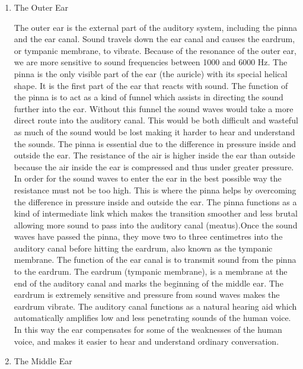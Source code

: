 \vfill
\begin{enumerate}
	\item The Outer Ear
	
	The outer ear is the external part of the auditory system, including the pinna 
	and the ear canal. Sound travels down the ear canal and causes the eardrum, 
	or tympanic membrane, to vibrate. Because of the resonance of the outer ear, 
	we are more sensitive to sound frequencies between 1000 and 6000 Hz.
	The pinna is the only visible part of the ear (the auricle) with its special helical shape. It is the first part of the ear that reacts with sound. The function of the pinna is to act as a kind of funnel which assists in directing the sound further into the ear. Without this funnel the sound waves would take a more direct route into the auditory canal. This would be both difficult and wasteful as much of the sound would be lost making it harder to hear and understand the sounds. The pinna is essential due to the difference in pressure inside and outside the ear. The resistance of the air is higher inside the ear than outside because the air inside the ear is compressed and thus under greater pressure.
	In order for the sound waves to enter the ear in the best possible way the resistance must not be too high. This is where the pinna helps by overcoming the difference in pressure inside and outside the ear. The pinna functions as a kind of intermediate link which makes the transition smoother and less brutal allowing more sound to pass into the auditory canal (meatus).Once the sound waves have passed the pinna, they move two to three centimetres into the auditory canal before hitting the eardrum, also known as the tympanic membrane. The function of the ear canal is to transmit sound from the pinna to the eardrum. The eardrum (tympanic membrane), is a membrane at the end of the auditory canal and marks the beginning of the middle ear. The eardrum is extremely sensitive and pressure from sound waves makes the eardrum vibrate.  The auditory canal  functions as a natural hearing aid which automatically amplifies low and less penetrating sounds of the human voice. In this way the ear compensates for some of the weaknesses of the human voice, and makes it easier to hear and understand ordinary conversation.
	
	\item The Middle Ear
	

\end{enumerate}

